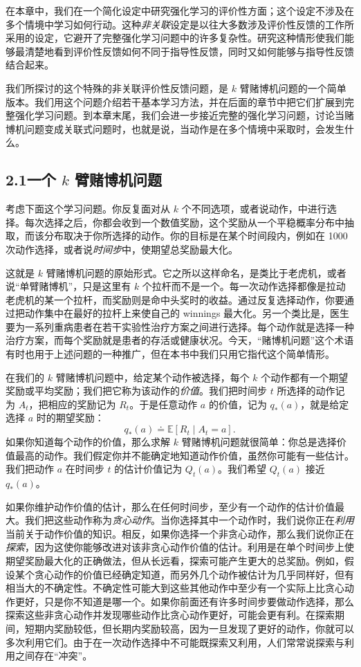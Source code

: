 \documentclass[UTF8,12pt,a4paper,fontset=fandol]{ctexart}
\begin{document}
在本章中，我们在一个简化设定中研究强化学习的评价性方面；这个设定不涉及在多个情境中学习如何行动。这种\textit{非关联}设定是以往大多数涉及评价性反馈的工作所采用的设定，它避开了完整强化学习问题中的许多复杂性。研究这种情形使我们能够最清楚地看到评价性反馈如何不同于指导性反馈，同时又如何能够与指导性反馈结合起来。

我们所探讨的这个特殊的非关联评价性反馈问题，是 $k$ 臂赌博机问题的一个简单版本。我们用这个问题介绍若干基本学习方法，并在后面的章节中把它们扩展到完整强化学习问题。到本章末尾，我们会进一步接近完整的强化学习问题，讨论当赌博机问题变成关联式问题时，也就是说，当动作是在多个情境中采取时，会发生什么。

\subsection*{2.1\quad 一个 $k$ 臂赌博机问题}

考虑下面这个学习问题。你反复面对从 $k$ 个不同选项，或者说动作，中进行选择。每次选择之后，你都会收到一个数值奖励，这个奖励从一个平稳概率分布中抽取，而该分布取决于你所选择的动作。你的目标是在某个时间段内，例如在 1000 次动作选择，或者说\textit{时间步}中，使期望总奖励最大化。

这就是 $k$ 臂赌博机问题的原始形式。它之所以这样命名，是类比于老虎机，或者说“单臂赌博机”，只是这里有 $k$ 个拉杆而不是一个。每一次动作选择都像是拉动老虎机的某一个拉杆，而奖励则是命中头奖时的收益。通过反复选择动作，你要通过把动作集中在最好的拉杆上来使自己的 winnings 最大化。另一个类比是，医生要为一系列重病患者在若干实验性治疗方案之间进行选择。每个动作就是选择一种治疗方案，而每个奖励就是患者的存活或健康状况。今天，“赌博机问题”这个术语有时也用于上述问题的一种推广，但在本书中我们只用它指代这个简单情形。

在我们的 $k$ 臂赌博机问题中，给定某个动作被选择，每个 $k$ 个动作都有一个期望奖励或平均奖励；我们把它称为该动作的\textit{价值}。我们把时间步 $t$ 所选择的动作记为 $A_t$，把相应的奖励记为 $R_t$。于是任意动作 $a$ 的价值，记为 $q_*(a)$，就是给定选择 $a$ 时的期望奖励：
\[
q_*(a)\doteq \mathbb{E}[R_t \mid A_t=a].
\]
如果你知道每个动作的价值，那么求解 $k$ 臂赌博机问题就很简单：你总是选择价值最高的动作。我们假定你并不能确定地知道动作价值，虽然你可能有一些估计。我们把动作 $a$ 在时间步 $t$ 的估计价值记为 $Q_t(a)$。我们希望 $Q_t(a)$ 接近 $q_*(a)$。

如果你维护动作价值的估计，那么在任何时间步，至少有一个动作的估计价值最大。我们把这些动作称为\textit{贪心动作}。当你选择其中一个动作时，我们说你正在\textit{利用}当前关于动作价值的知识。相反，如果你选择一个非贪心动作，那么我们说你正在\textit{探索}，因为这使你能够改进对该非贪心动作价值的估计。利用是在单个时间步上使期望奖励最大化的正确做法，但从长远看，探索可能产生更大的总奖励。例如，假设某个贪心动作的价值已经确定知道，而另外几个动作被估计为几乎同样好，但有相当大的不确定性。不确定性可能大到这些其他动作中至少有一个实际上比贪心动作更好，只是你不知道是哪一个。如果你前面还有许多时间步要做动作选择，那么探索这些非贪心动作并发现哪些动作比贪心动作更好，可能会更有利。在探索期间，短期内奖励较低，但长期内奖励较高，因为一旦发现了更好的动作，你就可以多次利用它们。由于在一次动作选择中不可能既探索又利用，人们常常说探索与利用之间存在“冲突”。
\end{document}
